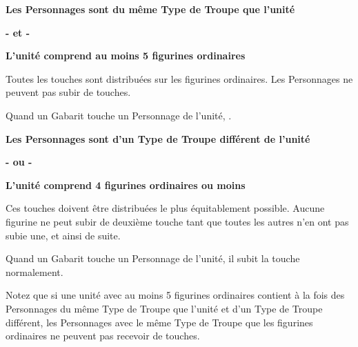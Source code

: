 \setlength\columnseprule{0.5pt}
\begin{multicols}{2}\raggedcolumns

\noindent
\begin{center}\textbf{Les Personnages sont du même Type de Troupe que l'unité}\end{center}
\vspace*{-0.8cm}\begin{center}\textbf{- et -}\end{center}
\vspace*{-0.8cm}\begin{center}\textbf{L'unité comprend au moins 5 figurines ordinaires}\end{center}

\noindent Toutes les touches sont distribuées sur les figurines ordinaires. Les Personnages ne peuvent pas subir de touches.

\noindent Quand un Gabarit touche un Personnage de l'unité, .

\columnbreak

\noindent
\begin{center}\textbf{Les Personnages sont d'un Type de Troupe différent de l'unité}\end{center}
\vspace*{-0.8cm}\begin{center}\textbf{- ou -}\end{center}
\vspace*{-0.8cm}\begin{center}\textbf{L'unité comprend 4 figurines ordinaires ou moins}\end{center}

\noindent {} Ces touches doivent être distribuées le plus équitablement possible. Aucune figurine ne peut subir de deuxième touche tant que toutes les autres n'en ont pas subie une, et ainsi de suite.

\noindent Quand un Gabarit touche un Personnage de l'unité, il subit la touche normalement.

\end{multicols}
\setlength\columnseprule{0pt}

Notez que si une unité avec au moins 5 figurines ordinaires contient à la fois des Personnages du même Type de Troupe que l'unité et d'un Type de Troupe différent, les Personnages avec le même Type de Troupe que les figurines ordinaires ne peuvent pas recevoir de touches.


